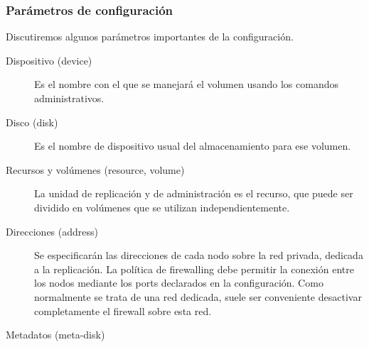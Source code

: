 \subsubsection{Parámetros de configuración}
Discutiremos algunos parámetros importantes de la configuración.
\begin{description}
	\item [Dispositivo (device)] Es el nombre con el que se manejará el volumen usando los comandos administrativos.
	\item [Disco (disk)] Es el nombre de dispositivo usual del almacenamiento para ese volumen. 
	\item [Recursos y volúmenes (resource, volume)] La unidad de replicación y de administración es el recurso, que puede ser dividido en volúmenes que se utilizan independientemente. 
% 

% 
	\item [Direcciones (address)] Se especificarán las direcciones de cada nodo sobre la red privada, dedicada a la replicación. La política de firewalling debe permitir la conexión entre los nodos mediante los ports declarados en la configuración. Como normalmente se trata de una red dedicada, suele ser conveniente desactivar completamente el firewall sobre esta red.

	\item [Metadatos (meta-disk)] 


\end{description}
